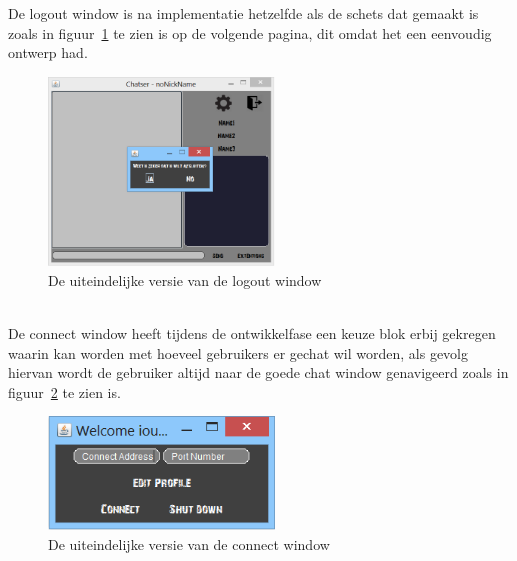 \documentclass[12pt]{article}
\begin{document}
\noindent De logout window is na implementatie hetzelfde als de schets dat gemaakt is zoals in figuur~\ref{figure010} te zien is op de volgende pagina, dit omdat het een eenvoudig ontwerp had.
\begin{figure}[ht]
\begin{center}
\includegraphics[width = 60mm]{chatserafsluiten}
\caption{De uiteindelijke versie van de logout window}
\label{figure010}
\end{center}
\end{figure}
\\
\newpage
\noindent De connect window heeft tijdens de ontwikkelfase een keuze blok erbij gekregen waarin kan worden met hoeveel gebruikers er gechat wil worden, als gevolg hiervan wordt de gebruiker altijd naar de goede chat window genavigeerd zoals in figuur~\ref{figure011} te zien is.
\begin{figure}[ht]
\begin{center}
\includegraphics[width = 60mm]{connection_met_profiel}
\caption{De uiteindelijke versie van de connect window}
\label{figure011}
\end{center}
\end{figure}
\\
\end{document}
